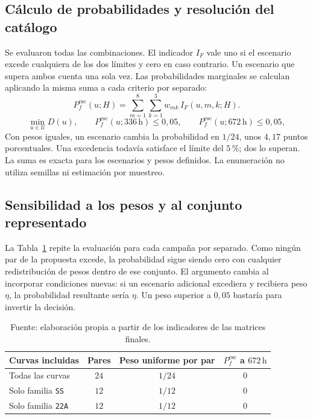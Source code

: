 \subsection{Cálculo de probabilidades y resolución del catálogo}
Se evaluaron todas las combinaciones. El indicador $I_F$ vale uno si el escenario excede cualquiera de los dos límites y cero en caso contrario. Un escenario que supera ambos cuenta una sola vez. Las probabilidades marginales se calculan aplicando la misma suma a cada criterio por separado:
\begin{equation}
  P_f^{\mathrm{esc}}(u;H)=
  \sum_{m=1}^{8}\sum_{k=1}^{3}
  w_{mk}\,I_F(u,m,k;H).
  \label{eq:probabilidad-enumerada}
\end{equation}
\begin{equation}
  \min_{u\in\mathcal U}D(u),
  \qquad P_f^{\mathrm{esc}}(u;336\,\mathrm h)\leq0{,}05,
  \qquad P_f^{\mathrm{esc}}(u;672\,\mathrm h)\leq0{,}05,
  \label{eq:problema-optimizacion}
\end{equation}
Con pesos iguales, un escenario cambia la probabilidad en $1/24$, unos $4{,}17$ puntos porcentuales. Una excedencia todavía satisface el límite del $5\,\text{\%}$; dos lo superan. La suma es exacta para los escenarios y pesos definidos. La enumeración no utiliza semillas ni estimación por muestreo.

\subsection{Sensibilidad a los pesos y al conjunto representado}
La Tabla~\ref{tab:sensibilidad-pesos} repite la evaluación para cada campaña por separado. Como ningún par de la propuesta excede, la probabilidad sigue siendo cero con cualquier redistribución de pesos dentro de ese conjunto. El argumento cambia al incorporar condiciones nuevas: si un escenario adicional excediera y recibiera peso $\eta$, la probabilidad resultante sería $\eta$. Un peso superior a $0{,}05$ bastaría para invertir la decisión.
\begin{table}[htbp]
  \centering
  \caption{Sensibilidad de la probabilidad a la selección de curvas del catálogo}
  \label{tab:sensibilidad-pesos}
  \small
  \begin{tabular}{lccc}
    \toprule
    Curvas incluidas & Pares & Peso uniforme por par & $P_f^{\mathrm{esc}}$ a $672\,\mathrm h$ \\
    \midrule
    Todas las curvas & $24$ & $1/24$ & $0$ \\
    Solo familia \texttt{SS} & $12$ & $1/12$ & $0$ \\
    Solo familia \texttt{22A} & $12$ & $1/12$ & $0$ \\
    \bottomrule
  \end{tabular}
  \captionsetup{skip=2pt}
  \caption*{Fuente: elaboración propia a partir de los indicadores de las matrices finales.}
\end{table}

